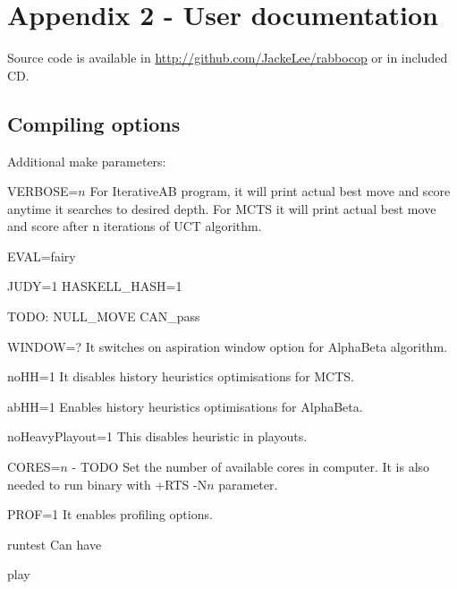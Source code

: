 
\chapter{Appendix 2 - User documentation}
Source code is available in \url{http://github.com/JackeLee/rabbocop} or in included CD.

\section{Compiling options}
Additional make parameters:

VERBOSE=$n$
  For IterativeAB program, it will print actual best move and score anytime
  it searches to desired depth.
  For MCTS it will print actual best move and score after n iterations of
  UCT algorithm.

EVAL=fairy

JUDY=1
HASKELL\_HASH=1

TODO: NULL\_MOVE CAN\_pass

WINDOW=?
	It switches on aspiration window option for AlphaBeta algorithm.

noHH=1
	It disables history heuristics optimisations for MCTS.

abHH=1
	Enables history heuristics optimisations for AlphaBeta.

noHeavyPlayout=1
	This disables heuristic in playouts.

CORES=$n$ - TODO
	Set the number of available cores in computer. It is also needed to run
	binary with +RTS -N$n$ parameter.

PROF=1
	It enables profiling options.

runtest
	Can have

play
